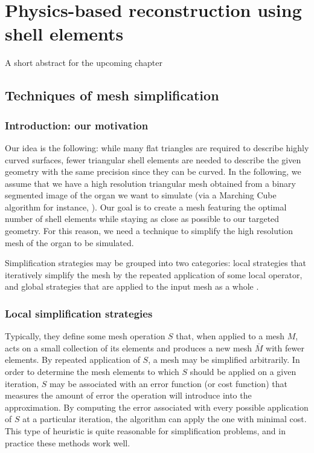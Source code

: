 \chapter{Physics-based reconstruction using shell elements}
\label{chap10}
\begin{shortAbstract}
A short abstract for the upcoming chapter \\
\end{shortAbstract}


\section{Techniques of mesh simplification}

\subsection{Introduction: our motivation}

Our idea is the following: while many flat triangles are required to describe highly curved surfaces, fewer triangular shell elements are needed to describe the given geometry with the same precision since they can be curved. In the following, we assume that we have a high resolution triangular mesh obtained from a binary segmented image of the organ we want to simulate (via a Marching Cube algorithm for instance, \cite{Lorensen87}). Our goal is to create a mesh featuring the optimal number of shell elements while staying as close as possible to our targeted geometry. For this reason, we need a technique to simplify the high resolution mesh of the organ to be simulated. 

Simplification strategies may be grouped into two categories: local strategies that iteratively simplify the mesh by the repeated application of some local operator, and global strategies that are applied to the input mesh as a whole \citep{Cignoni97,Talton04}.

\subsection{Local simplification strategies}

Typically, they define some mesh operation $S$ that, when applied to a mesh $M$, acts on a small collection of its elements and produces a new mesh $\overline{M}$  with fewer elements. By repeated application of $S$, a mesh may be simplified arbitrarily. In order to determine the mesh elements to which $S$ should be applied on a given iteration, $S$ may be associated with an error function (or cost function) that measures the amount of error the operation will introduce into the approximation. By computing the error associated with every possible application of $S$ at a particular iteration, the algorithm can apply the one with minimal cost. This type of heuristic is quite reasonable for simplification problems, and in practice these methods work well.

